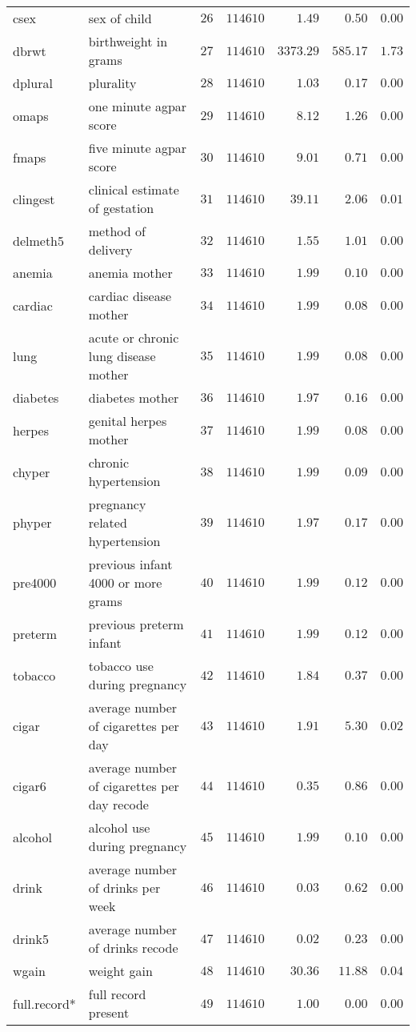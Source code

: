 \begin{longtable}{llrrrrr}
csex&sex of child&$26$&$114610$&$   1.49$&$  0.50$&$0.00$\tabularnewline
dbrwt&birthweight in grams&$27$&$114610$&$3373.29$&$585.17$&$1.73$\tabularnewline
dplural&plurality&$28$&$114610$&$   1.03$&$  0.17$&$0.00$\tabularnewline
omaps&one minute agpar score&$29$&$114610$&$   8.12$&$  1.26$&$0.00$\tabularnewline
fmaps&five minute agpar score&$30$&$114610$&$   9.01$&$  0.71$&$0.00$\tabularnewline
clingest&clinical estimate of gestation&$31$&$114610$&$  39.11$&$  2.06$&$0.01$\tabularnewline
delmeth5&method of delivery&$32$&$114610$&$   1.55$&$  1.01$&$0.00$\tabularnewline
anemia&anemia mother&$33$&$114610$&$   1.99$&$  0.10$&$0.00$\tabularnewline
cardiac&cardiac disease mother&$34$&$114610$&$   1.99$&$  0.08$&$0.00$\tabularnewline
lung&acute or chronic lung disease mother&$35$&$114610$&$   1.99$&$  0.08$&$0.00$\tabularnewline
diabetes&diabetes mother&$36$&$114610$&$   1.97$&$  0.16$&$0.00$\tabularnewline
herpes&genital herpes mother&$37$&$114610$&$   1.99$&$  0.08$&$0.00$\tabularnewline
chyper&chronic hypertension&$38$&$114610$&$   1.99$&$  0.09$&$0.00$\tabularnewline
phyper&pregnancy related hypertension&$39$&$114610$&$   1.97$&$  0.17$&$0.00$\tabularnewline
pre4000&previous infant 4000 or more grams&$40$&$114610$&$   1.99$&$  0.12$&$0.00$\tabularnewline
\newpage
preterm&previous preterm infant&$41$&$114610$&$   1.99$&$  0.12$&$0.00$\tabularnewline
tobacco&tobacco use during pregnancy&$42$&$114610$&$   1.84$&$  0.37$&$0.00$\tabularnewline
cigar&average number of cigarettes per day&$43$&$114610$&$   1.91$&$  5.30$&$0.02$\tabularnewline
cigar6&average number of cigarettes per day recode&$44$&$114610$&$   0.35$&$  0.86$&$0.00$\tabularnewline
alcohol&alcohol use during pregnancy&$45$&$114610$&$   1.99$&$  0.10$&$0.00$\tabularnewline
drink&average number of drinks per week&$46$&$114610$&$   0.03$&$  0.62$&$0.00$\tabularnewline
drink5&average number of drinks recode&$47$&$114610$&$   0.02$&$  0.23$&$0.00$\tabularnewline
wgain&weight gain&$48$&$114610$&$  30.36$&$ 11.88$&$0.04$\tabularnewline
full.record*&full record present&$49$&$114610$&$   1.00$&$  0.00$&$0.00$\tabularnewline
\hline
\end{longtable}


